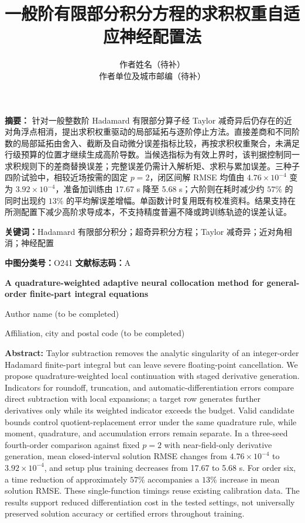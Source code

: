 \documentclass[UTF8,fontset=none,10.5pt,a4paper]{ctexart}
\title{\bfseries 一般阶有限部分积分方程的求积权重自适应神经配置法}
\author{作者姓名（待补）\\
\small 作者单位及城市邮编（待补）}
\date{}
\numberwithin{equation}{section}
\begin{document}
\maketitle
\vspace{-2.0em}

\noindent\textbf{摘\quad 要：}
针对一般整数阶 Hadamard 有限部分算子经 Taylor 减奇异后仍存在的近对角浮点相消，提出求积权重驱动的局部延拓与逐阶停止方法。直接差商和不同阶数的局部延拓由舍入、截断及自动微分误差指标比较，再按求积权重聚合，未满足行级预算的位置才继续生成高阶导数。当候选指标为有效上界时，该判据控制同一求积规则下的差商替换误差；完整误差仍需计入解析矩、求积与累加误差。三种子四阶试验中，相较近场按需的固定 $p=2$，闭区间解 RMSE 均值由 $4.76\times10^{-4}$ 变为 $3.92\times10^{-4}$，准备加训练由 17.67 s 降至 5.68 s；六阶则在耗时减少约 $57\%$ 的同时出现约 $13\%$ 的平均解误差增幅。单函数计时复用既有校准资料。结果支持在所测配置下减少高阶求导成本，不支持精度普遍不降或跨训练轨迹的误差认证。

\noindent\textbf{关键词：}Hadamard 有限部分积分；超奇异积分方程；Taylor 减奇异；近对角相消；神经配置

\noindent\textbf{中图分类号：}O241\hfill
\textbf{文献标志码：}A

\vspace{0.8em}
\begin{center}
{\large\bfseries A quadrature-weighted adaptive neural collocation method for general-order finite-part integral equations}\par
\vspace{0.4em}
{Author name (to be completed)}\par
{\small Affiliation, city and postal code (to be completed)}
\end{center}

\noindent\textbf{Abstract:}
Taylor subtraction removes the analytic singularity of an integer-order Hadamard finite-part integral but can leave severe floating-point cancellation. We propose quadrature-weighted local continuation with staged derivative generation. Indicators for roundoff, truncation, and automatic-differentiation errors compare direct subtraction with local expansions; a target row generates further derivatives only while its weighted indicator exceeds the budget. Valid candidate bounds control quotient-replacement error under the same quadrature rule, while moment, quadrature, and accumulation errors remain separate. In a three-seed fourth-order comparison against fixed $p=2$ with near-field-only derivative generation, mean closed-interval solution RMSE changes from $4.76\times10^{-4}$ to $3.92\times10^{-4}$, and setup plus training decreases from 17.67 to 5.68 s. For order six, a time reduction of approximately $57\%$ accompanies a $13\%$ increase in mean solution RMSE. These single-function timings reuse existing calibration data. The results support reduced differentiation cost in the tested settings, not universally preserved solution accuracy or certified errors throughout training.
\end{document}
